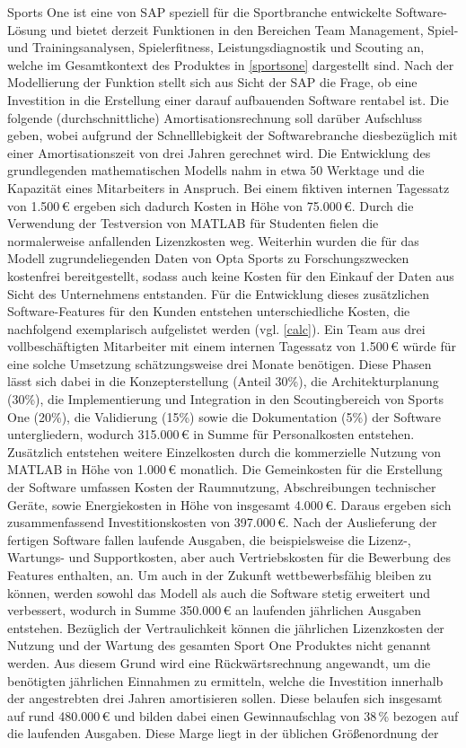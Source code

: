 Sports One ist eine von SAP speziell für die Sportbranche entwickelte Software-Lösung und bietet derzeit Funktionen in den Bereichen Team Management, Spiel- und Trainingsanalysen, Spielerfitness, Leistungsdiagnostik und Scouting an, welche im Gesamtkontext des Produktes in \vref{sportsone} dargestellt sind. Nach der Modellierung der Funktion stellt sich aus Sicht der SAP die Frage, ob eine Investition in die Erstellung einer darauf aufbauenden Software rentabel ist. Die folgende (durchschnittliche) Amortisationsrechnung soll darüber Aufschluss geben, wobei aufgrund der Schnelllebigkeit der Softwarebranche diesbezüglich mit einer Amortisationszeit von drei Jahren gerechnet wird. Die Entwicklung des grundlegenden mathematischen Modells nahm in etwa 50 Werktage und die Kapazität eines Mitarbeiters in Anspruch. Bei einem fiktiven internen Tagessatz von \textsf{1.500\,\euro} ergeben sich dadurch Kosten in Höhe von \textsf{75.000\,\euro}. Durch die Verwendung der Testversion von MATLAB für Studenten fielen die normalerweise anfallenden Lizenzkosten weg. Weiterhin wurden die für das Modell zugrundeliegenden Daten von Opta Sports zu Forschungszwecken kostenfrei bereitgestellt, sodass auch keine Kosten für den Einkauf der Daten aus Sicht des Unternehmens entstanden. Für die Entwicklung dieses zusätzlichen Software-Features für den Kunden entstehen unterschiedliche Kosten, die nachfolgend exemplarisch aufgelistet werden (vgl. \vref{calc}). Ein Team aus drei vollbeschäftigten Mitarbeiter mit einem internen Tagessatz von \textsf{1.500\,\euro} würde für eine solche Umsetzung schätzungsweise drei Monate benötigen. Diese Phasen lässt sich dabei in die Konzepterstellung (Anteil 30\%), die Architekturplanung (30\%), die Implementierung und Integration in den Scoutingbereich von Sports One (20\%), die Validierung (15\%) sowie die Dokumentation (5\%) der Software untergliedern, wodurch \textsf{315.000\,\euro} in Summe für Personalkosten entstehen. Zusätzlich entstehen weitere Einzelkosten durch die kommerzielle Nutzung von MATLAB in Höhe von \textsf{1.000\,\euro} monatlich. Die Gemeinkosten für die Erstellung der Software umfassen Kosten der Raumnutzung, Abschreibungen technischer Geräte, sowie Energiekosten in Höhe von insgesamt \textsf{4.000\,\euro}. Daraus ergeben sich zusammenfassend Investitionskosten von \textsf{397.000\,\euro}. Nach der Auslieferung der fertigen Software fallen laufende Ausgaben, die beispielsweise die Lizenz-, Wartungs- und Supportkosten, aber auch Vertriebskosten für die Bewerbung des Features enthalten, an. Um auch in der Zukunft wettbewerbsfähig bleiben zu können, werden sowohl das Modell als auch die Software stetig erweitert und verbessert, wodurch in Summe \textsf{350.000\,\euro} an laufenden jährlichen Ausgaben entstehen. Bezüglich der Vertraulichkeit können die jährlichen Lizenzkosten der Nutzung und der Wartung des gesamten Sport One Produktes nicht genannt werden. Aus diesem Grund wird eine Rückwärtsrechnung angewandt, um die benötigten jährlichen Einnahmen zu ermitteln, welche die Investition innerhalb der angestrebten drei Jahren amortisieren sollen. Diese belaufen sich insgesamt auf rund \textsf{480.000\,\euro} und bilden dabei einen Gewinnaufschlag von \textsf{38\,\%} bezogen auf die laufenden Ausgaben. Diese Marge liegt in der üblichen Größenordnung der 